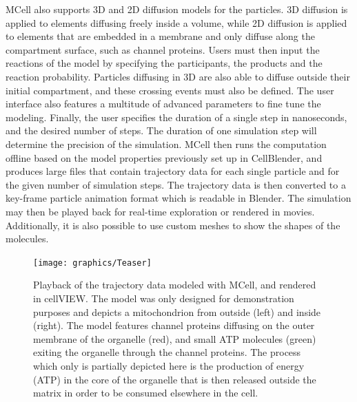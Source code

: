 MCell also supports 3D and 2D diffusion models for the particles.
3D diffusion is applied to elements diffusing freely inside a volume, while 2D diffusion is applied to elements that are embedded in a membrane and only diffuse along the compartment surface, such as channel proteins.
Users must then input the reactions of the model by specifying the participants, the products and the reaction probability.
Particles diffusing in 3D are also able to diffuse outside their initial compartment, and these crossing events must also be defined.
The user interface also features a multitude of advanced parameters to fine tune the modeling.
Finally, the user specifies the duration of a single step in nanoseconds, and the desired number of steps. 
The duration of one simulation step will determine the precision of the simulation.
MCell then runs the computation offline based on the model properties previously set up in CellBlender, and produces large files that contain trajectory data for each single particle and for the given number of simulation steps.
The trajectory data is then converted to a key-frame particle animation format which is readable in Blender.
The simulation may then be played back for real-time exploration or rendered in movies.
Additionally, it is also possible to use custom meshes to show the shapes of the molecules.

\begin{figure}
\centering
\texttt{[image: graphics/Teaser]}
\caption{Playback of the trajectory data modeled with MCell, and rendered in cellVIEW. The model was only designed for demonstration purposes and depicts a mitochondrion from outside (left) and inside (right). The model features channel proteins diffusing on the outer membrane of the organelle (red), and small ATP molecules (green) exiting the organelle through the channel proteins. The process which only is partially depicted here is the production of energy (ATP) in the core of the organelle that is then released outside the matrix in order to be consumed elsewhere in the cell.}
\label{fig:teaser}
\end{figure}


